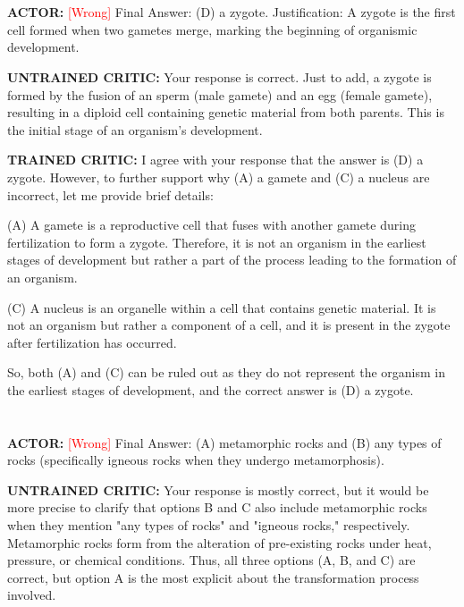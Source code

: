 \section*{}

\textbf{ACTOR:} \textcolor{red}{[Wrong]}
 Final Answer: (D) a zygote. Justification: A zygote is the first cell formed when two gametes merge, marking the beginning of organismic development.



\textbf{UNTRAINED CRITIC:}
 Your response is correct. Just to add, a zygote is formed by the fusion of an sperm (male gamete) and an egg (female gamete), resulting in a diploid cell containing genetic material from both parents. This is the initial stage of an organism's development.



\textbf{TRAINED CRITIC:}
 I agree with your response that the answer is (D) a zygote. However, to further support why (A) a gamete and (C) a nucleus are incorrect, let me provide brief details:

(A) A gamete is a reproductive cell that fuses with another gamete during fertilization to form a zygote. Therefore, it is not an organism in the earliest stages of development but rather a part of the process leading to the formation of an organism.

(C) A nucleus is an organelle within a cell that contains genetic material. It is not an organism but rather a component of a cell, and it is present in the zygote after fertilization has occurred.

So, both (A) and (C) can be ruled out as they do not represent the organism in the earliest stages of development, and the correct answer is (D) a zygote.



\section*{}

\section*{}


\textbf{ACTOR:} \textcolor{red}{[Wrong]}
 Final Answer: (A) metamorphic rocks and (B) any types of rocks (specifically igneous rocks when they undergo metamorphosis).



\textbf{UNTRAINED CRITIC:}
 Your response is mostly correct, but it would be more precise to clarify that options B and C also include metamorphic rocks when they mention "any types of rocks" and "igneous rocks," respectively. Metamorphic rocks form from the alteration of pre-existing rocks under heat, pressure, or chemical conditions. Thus, all three options (A, B, and C) are correct, but option A is the most explicit about the transformation process involved.



